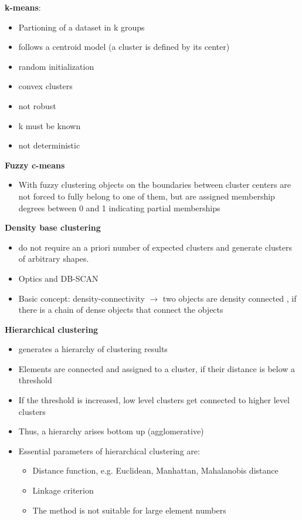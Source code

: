 \documentclass[11pt,ngerman]{article}
\begin{document}
\textbf{k-means}:
\begin{itemize}
	\item Partioning of a dataset in k groups
	\item follows a centroid model (a cluster is defined by its center)
	\item random initialization
	\item convex clusters
	\item not robust
	\item k must be known
	\item not deterministic
\end{itemize}
\textbf{Fuzzy c-means}
\begin{itemize}
 \item With fuzzy clustering objects on the boundaries between
cluster centers are not forced to fully belong to one of them,
but are assigned membership degrees between 0 and 1
indicating partial memberships
\end{itemize}
\textbf{Density base clustering}
\begin{itemize}
	\item do not require an a priori
number of expected clusters and generate clusters
of arbitrary shapes.
	\item Optics and DB-SCAN
	\item Basic concept: density-connectivity $\rightarrow$ two objects are
density connected , if there is a chain of dense objects that
connect the objects
\end{itemize}

\textbf{Hierarchical clustering}
\begin{itemize}
	\item generates a hierarchy of
clustering results
	\item Elements are connected and assigned to a cluster, if
their distance is below a threshold
	\item If the threshold is increased, low level clusters get
connected to higher level clusters
	\item Thus, a hierarchy arises bottom up (agglomerative)
	\item Essential parameters of hierarchical clustering are:
		\begin{itemize}
		\item  Distance function, e.g. Euclidean, Manhattan, Mahalanobis distance
		\item Linkage criterion
		\item The method is not suitable for large element numbers
		\end{itemize}
\end{itemize}
\end{document}
